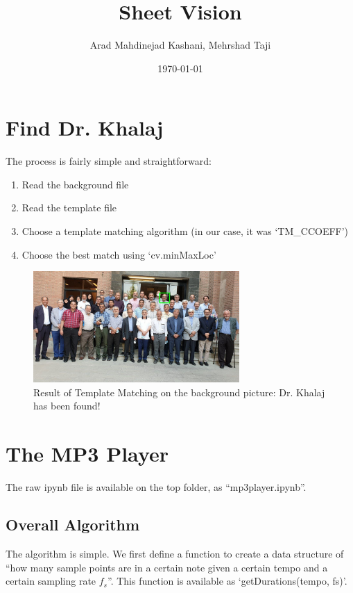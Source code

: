 \documentclass[12pt]{article}
\title{Sheet Vision}
\subtitle{Arad Mahdinejad Kashani, Mehrshad Taji}
\date{\today}
\begin{document}
\maketitlepage
\maketitlestart

\section{Find Dr. Khalaj}
The process is fairly simple and straightforward:
\begin{enumerate}
    \item Read the background file
    \item Read the template file
    \item Choose a template matching algorithm (in our case, it was `TM\_CCOEFF')
    \item Choose the best match using `cv.minMaxLoc'
\end{enumerate}

\begin{figure}[h!]
    \centering
    \includegraphics[width=0.7\textwidth]{found khalaj.JPG}
    \caption{Result of Template Matching on the background picture: Dr. Khalaj has been found!}
    \label{fig:1}
\end{figure}
\pagebreak

\section{The MP3 Player}
The raw ipynb file is available on the top folder, as ``mp3player.ipynb''.
\subsection{Overall Algorithm}
The algorithm is simple. We first define a function to create a data structure of 
``how many sample points are in a certain note given a certain tempo and a certain sampling rate $f_s$''. 
This function is available as `getDurations(tempo, fs)'.
\end{document}
